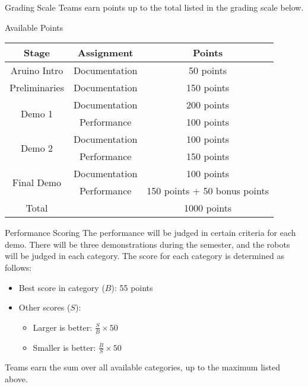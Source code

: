 \begin{frame}{Grading Scale}
Teams earn points up to the total listed in the grading scale below.
\begin{center}
\begin{block}{Available Points}
\begin{tabular}[t]{ccc}
Stage & Assignment & Points \\\hline
Aruino Intro & Documentation & 50 points \\\hline
Preliminaries & Documentation & 150 points \\\hline
\multirow{2}{*}{Demo 1}  & Documentation &200 points \\
& Performance & 100 points \\\hline
\multirow{2}{*}{Demo 2} & Documentation & 100 points \\
& Performance  & 150 points \\\hline
\multirow{2}{*}{Final Demo} & Documentation & 100 points \\
& Performance  & 150 points + 50 bonus points \\\hline
Total &  &  1000 points \\
\end{tabular}
\end{block}
\end{center}
\end{frame}


\begin{frame}{Performance Scoring}
The performance will be judged in certain criteria for each demo. There will be three demonstrations during the semester, and the robots will be judged in each category. The score for each category is determined as follows:
\begin{itemize}
\item Best score in category ($B$): 55 points
\item Other scores ($S$):
\begin{itemize}
\item Larger is better: $\frac{S}{B}\times 50$
\item Smaller is better: $\frac{B}{S}\times 50$
\end{itemize}
\end{itemize}
Teams earn the sum over all available categories, up to the maximum listed above.
\end{frame}

